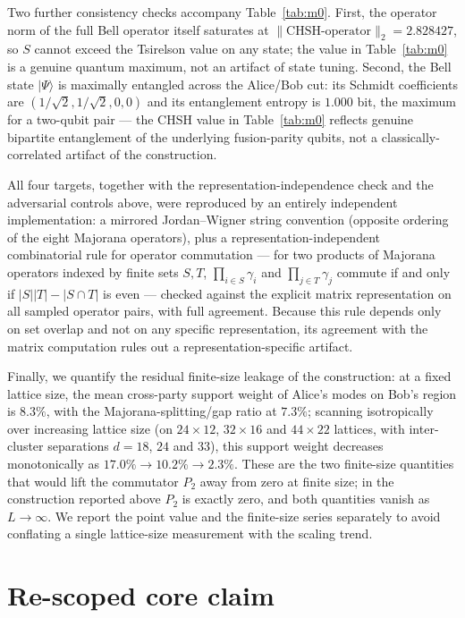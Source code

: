 \documentclass[aps,pra,twocolumn,superscriptaddress,floatfix,nofootinbib]{revtex4-2}
\providecommand{\ket}[1]{\lvert #1 \rangle}
\begin{document}
Two further consistency checks accompany Table~\ref{tab:m0}. First,
the operator norm of the full Bell operator itself saturates at
$\lVert\text{CHSH-operator}\rVert_2=2.828427$, so $S$ cannot exceed
the Tsirelson value on any state; the value in Table~\ref{tab:m0} is a
genuine quantum maximum, not an artifact of state tuning. Second, the
Bell state $\ket{\Psi}$ is maximally entangled across the Alice/Bob
cut: its Schmidt coefficients are $(1/\sqrt2,1/\sqrt2,0,0)$ and its
entanglement entropy is $1.000$ bit, the maximum for a two-qubit pair
--- the CHSH value in Table~\ref{tab:m0} reflects genuine bipartite
entanglement of the underlying fusion-parity qubits, not a
classically-correlated artifact of the construction.

All four targets, together with the representation-independence check
and the adversarial controls above, were reproduced by an entirely
independent implementation: a mirrored Jordan--Wigner string
convention (opposite ordering of the eight Majorana operators), plus a
representation-independent combinatorial rule for operator
commutation --- for two products of Majorana operators indexed by
finite sets $S,T$, $\prod_{i\in S}\gamma_i$ and $\prod_{j\in T}\gamma_j$
commute if and only if $|S||T|-|S\cap T|$ is even --- checked against
the explicit matrix representation on all sampled operator pairs, with
full agreement. Because this rule depends only on set overlap and not
on any specific representation, its agreement with the matrix
computation rules out a representation-specific artifact.

Finally, we quantify the residual finite-size leakage of the
construction: at a fixed lattice size, the mean cross-party
support weight of Alice's modes on Bob's region is $8.3\%$, with the
Majorana-splitting/gap ratio at $7.3\%$; scanning isotropically over
increasing lattice size (on $24\times12$, $32\times16$ and
$44\times22$ lattices, with inter-cluster separations $d=18$, $24$
and $33$), this support weight decreases monotonically as
$17.0\%\to10.2\%\to2.3\%$. These are the two finite-size quantities
that would lift the commutator $P_2$ away from zero at finite size; in
the construction reported above $P_2$ is exactly zero, and both
quantities vanish as $L\to\infty$. We report the point value and the finite-size series
separately to avoid conflating a single lattice-size measurement with
the scaling trend.

\section{Re-scoped core claim}
\label{sec:rescope}
\end{document}
